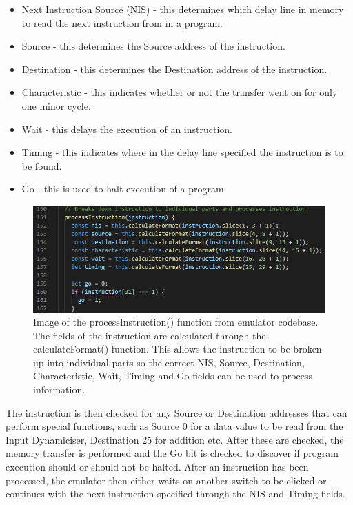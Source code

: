 \documentclass{l4proj}
\begin{document}
\begin{itemize}
	\item Next Instruction Source (NIS) - this determines which delay line in memory to read the next instruction from in a program.
	\item Source - this determines the Source address of the instruction.
	\item Destination - this determines the Destination address of the instruction.
	\item Characteristic - this indicates whether or not the transfer went on for only one minor cycle.
	\item Wait - this delays the execution of an instruction.
	\item Timing - this indicates where in the delay line specified the instruction is to be found.
	\item Go - this is used to halt execution of a program.
\end{itemize}

\begin{figure}[h]
	\centering
	\includegraphics[width=\linewidth]{images/instruction-fields}
	\caption{Image of the processInstruction() function from emulator codebase. The fields of the instruction are calculated through the calculateFormat() function. This allows the instruction to be broken up into individual parts so the correct NIS, Source, Destination, Characteristic, Wait, Timing and Go fields can be used to process information.}
	\label{fig:process-instruction}
\end{figure}

The instruction is then checked for any Source or Destination addresses that can perform special functions, such as Source 0 for a data value to be read from the Input Dynamiciser, Destination 25 for addition etc. After these are checked, the memory transfer is performed and the Go bit is checked to discover if program execution should or should not be halted. After an instruction has been processed, the emulator then either waits on another switch to be clicked or continues with the next instruction specified through the NIS and Timing fields.
\end{document}
